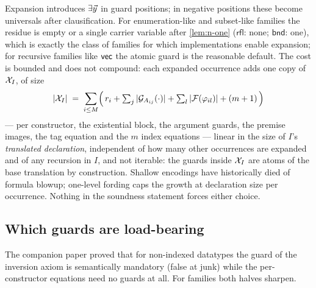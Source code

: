 \begin{remark}
Expansion introduces $\exists \vec{y}$ in guard positions; in negative
positions these become universals after clausification.  For
enumeration-like and subset-like families the residue is empty or a
single carrier variable after \cref{lem:n-one} ($\mathsf{rfl}$:
none; $\mathsf{bnd}$: one), which is exactly the class of families for
which implementations enable expansion; for recursive families like
$\mathsf{vec}$ the atomic guard is the reasonable default.  The cost is
bounded and does not compound: each expanded occurrence adds one copy
of $\mathcal{X}_{I}$, of size
\[
  |\mathcal{X}_{I}| \;=\; \sum_{i \le M} \Bigl(\, r_i +
  \textstyle\sum_j |\mathcal{G}_{A_{ij}}(\cdot)| +
  \sum_l |\mathcal{F}(\varphi_{il})| + (m + 1) \,\Bigr)
\]
--- per constructor, the existential block, the argument guards, the
premise images, the tag equation and the $m$ index equations ---
linear in the size of $I$'s \emph{translated declaration}, independent
of how many other occurrences are expanded and of any recursion in
$I$, and not iterable: the guards inside $\mathcal{X}_{I}$ are atoms of the
base translation by construction.  Shallow encodings have historically
died of formula blowup; one-level fording caps the growth at
declaration size per occurrence.  Nothing in the soundness statement
forces either choice.
\end{remark}

\subsection{Which guards are load-bearing}
\label{sec:formulas-guards}

The companion paper proved that for non-indexed datatypes the guard of
the inversion axiom is semantically mandatory (false at junk) while the
per-constructor equations need no guards at all.  For families both
halves sharpen.


